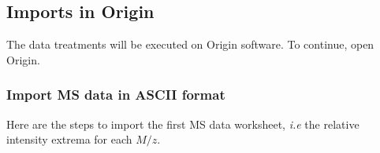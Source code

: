 \documentclass[a4paper, 11pt, raggedright, parskip]{tufte-style-article}
\begin{document}
\subsection{Imports in Origin}

The data treatments will be executed on Origin software. To continue, open Origin.


\subsubsection{Import MS data in ASCII format}

Here are the steps to import the first MS data worksheet, \textit{i.e} the relative intensity extrema for each $M/z$.
\end{document}
